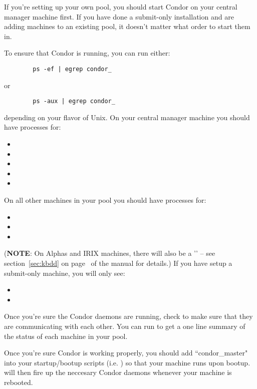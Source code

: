 If you're setting up your own pool, you should start Condor on your
central manager machine first.  If you have done a submit-only
installation and are adding machines to an existing pool, it doesn't
matter what order to start them in.

To ensure that Condor is running, you can run either:
\begin{verbatim}
        ps -ef | egrep condor_
\end{verbatim}
or
\begin{verbatim}
        ps -aux | egrep condor_
\end{verbatim}
depending on your flavor of Unix.  On your central manager machine you
should have processes for:
\begin{itemize}
	\item {}
	\item {}
	\item {}
	\item {}
	\item {}
\end{itemize}
On all other machines in your pool you should have processes for:
\begin{itemize}
	\item {}
	\item {}
	\item {}
\end{itemize}
(\textbf{NOTE}: On Alphas and IRIX machines, there will also be a
	'' -- see section~\ref{sec:kbdd} on
	page~\pageref{sec:kbdd} of the manual for details.)  If you
	have setup a submit-only machine, you will only see:
\begin{itemize}
	\item {}
	\item {}
\end{itemize}

Once you're sure the Condor daemons are running, check to make sure
that they are communicating with each other.  You can run
 to get a one line summary of the status of each
machine in your pool.

Once you're sure Condor is working properly, you should add
``condor\_master" into your startup/bootup scripts (i.e.  ) so
that your machine runs  upon bootup.  
will then fire up the neccesary Condor daemons whenever your machine
is rebooted.  

